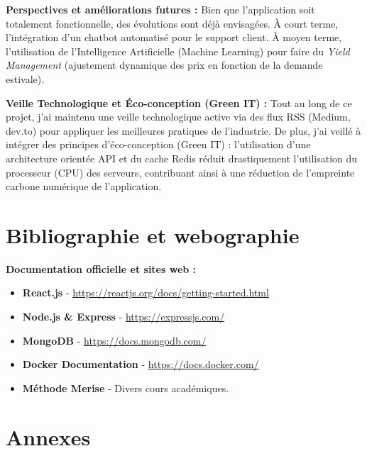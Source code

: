\documentclass[12pt, a4paper]{report}
\begin{document}
\textbf{Perspectives et améliorations futures :}
Bien que l'application soit totalement fonctionnelle, des évolutions sont déjà envisagées. À court terme, l'intégration d'un chatbot automatisé pour le support client. À moyen terme, l'utilisation de l'Intelligence Artificielle (Machine Learning) pour faire du \textit{Yield Management} (ajustement dynamique des prix en fonction de la demande estivale).

\textbf{Veille Technologique et Éco-conception (Green IT) :}
Tout au long de ce projet, j'ai maintenu une veille technologique active via des flux RSS (Medium, dev.to) pour appliquer les meilleures pratiques de l'industrie. De plus, j'ai veillé à intégrer des principes d'éco-conception (Green IT) : l'utilisation d'une architecture orientée API et du cache Redis réduit drastiquement l'utilisation du processeur (CPU) des serveurs, contribuant ainsi à une réduction de l'empreinte carbone numérique de l'application.

\chapter*{Bibliographie et webographie}

\textbf{Documentation officielle et sites web :}
\begin{itemize}
    \item \textbf{React.js} - \url{https://reactjs.org/docs/getting-started.html}
    \item \textbf{Node.js \& Express} - \url{https://expressjs.com/}
    \item \textbf{MongoDB} - \url{https://docs.mongodb.com/}
    \item \textbf{Docker Documentation} - \url{https://docs.docker.com/}
    \item \textbf{Méthode Merise} - Divers cours académiques.
\end{itemize}

\appendix
\chapter{Annexes}
\end{document}

